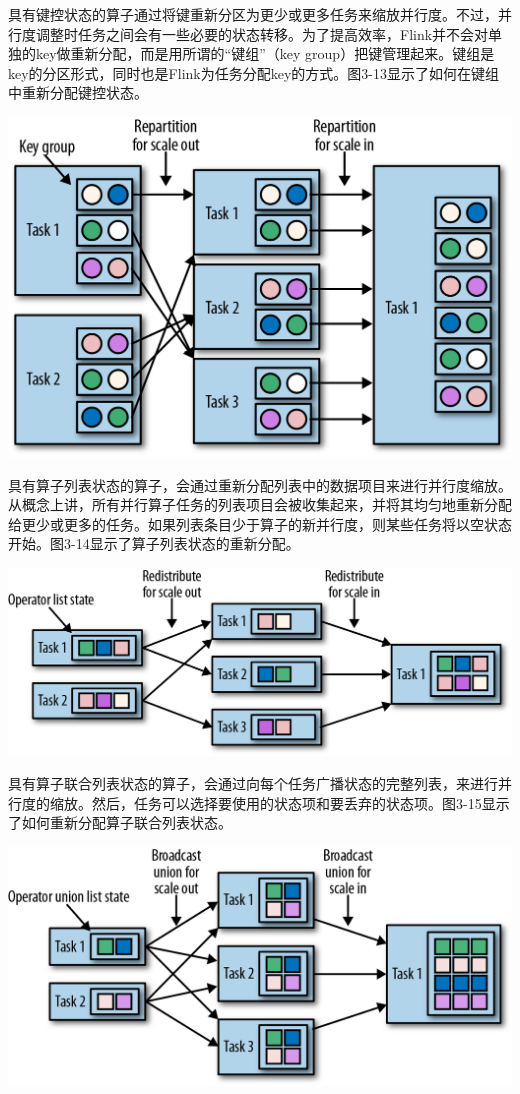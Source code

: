\documentclass[oneside]{ctexbook}
\begin{document}
具有键控状态的算子通过将键重新分区为更少或更多任务来缩放并行度。不过，并行度调整时任务之间会有一些必要的状态转移。为了提高效率，Flink并不会对单独的key做重新分配，而是用所谓的“键组”（key group）把键管理起来。键组是key的分区形式，同时也是Flink为任务分配key的方式。图3-13显示了如何在键组中重新分配键控状态。

\noindent \includegraphics[width=\textwidth]{spaf_0313.png}

具有算子列表状态的算子，会通过重新分配列表中的数据项目来进行并行度缩放。从概念上讲，所有并行算子任务的列表项目会被收集起来，并将其均匀地重新分配给更少或更多的任务。如果列表条目少于算子的新并行度，则某些任务将以空状态开始。图3-14显示了算子列表状态的重新分配。

\noindent \includegraphics[width=\textwidth]{spaf_0314.png}

具有算子联合列表状态的算子，会通过向每个任务广播状态的完整列表，来进行并行度的缩放。然后，任务可以选择要使用的状态项和要丢弃的状态项。图3-15显示了如何重新分配算子联合列表状态。

\noindent \includegraphics[width=\textwidth]{spaf_0315.png}
\end{document}
